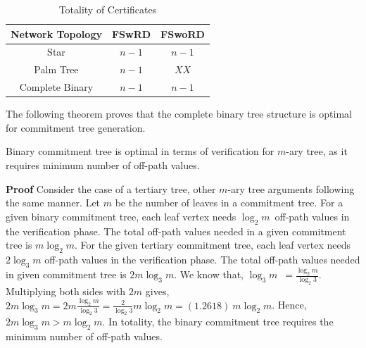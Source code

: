 		\begin{table}[!htb]
			\begin{center}
				\caption{Totality of Certificates}
				\label{tab:analysis-table-2}
				\begin{tabular}{|c||c|c|}
					\hline
					Network Topology & FSwRD & FSwoRD \\
					\hline
					\hline
					Star & $n - 1$ & $n -1$ \\
					\hline
					Palm Tree & $n - 1$ & $XX$\\
					\hline
					Complete Binary & $n - 1$ & $n - 1$\\
					\hline
				\end{tabular}
			\end{center}
		\end{table}
	The following theorem proves that the complete binary tree structure is optimal for commitment tree generation.
	\begin{theorem}
		\label{the:ct}
		Binary commitment tree is optimal in terms of verification for $m$-ary tree, as it requires minimum number of off-path values.
	\end{theorem}
	\textbf{Proof}
	Consider the case of a tertiary tree, other $m$-ary tree arguments following the same manner.
	Let $m$ be the number of leaves in a commitment tree.
	For a given binary commitment tree, each leaf vertex needs $\log_2 m$\ off-path values in the verification phase.
	The total off-path values needed in a given commitment tree is ${m \log_2 m}$.
	For the given tertiary commitment tree, each leaf vertex needs $2 \log_3 m$ off-path values in the verification phase.
	The total off-path values needed in given commitment tree is $2 m \log_3 m$.
	We know that, $\log_3 m$\  $= \frac{ {\log _2 m } }{{\log _2  3 }}$. 
	Multiplying both sides with  $2m$  gives, $2m\log_3 m = 2m\frac{ {\log _2 m } }{{\log _2  3 }} = \frac{ {2 } } {{\log _2  3 }}m\log _2 m = (1.2618)\ m\log _2 m$.
	Hence, $2m\log_3 m > m\log _2 m$. 
	In totality, the binary commitment tree requires the minimum number of off-path values.
